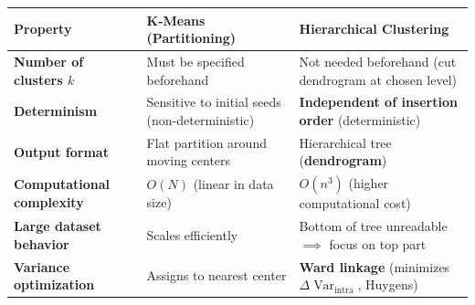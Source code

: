 \documentclass[10pt,a4paper]{article}
\begin{document}
\vspace{4pt}

\par\vspace{3pt}
\begin{center}
\small
\begin{tabular}{p{}p{}p{}}
\toprule
\rowcolor{lightbg}
\textbf{Property} & \textbf{K-Means (Partitioning)} & \textbf{Hierarchical Clustering} \\
\midrule
\textbf{Number of clusters $k$} & Must be specified beforehand & Not needed beforehand (cut dendrogram at chosen level) \\
\addlinespace[2pt]
\textbf{Determinism} & Sensitive to initial seeds (non-deterministic) & \textbf{Independent of insertion order} (deterministic) \\
\addlinespace[2pt]
\textbf{Output format} & Flat partition around moving centers & Hierarchical tree (\textbf{dendrogram}) \\
\addlinespace[2pt]
\textbf{Computational complexity} & \textbf{$O(N)$} (linear in data size) & \textbf{$O(n^3)$} (higher computational cost) \\
\addlinespace[2pt]
\textbf{Large dataset behavior} & Scales efficiently & Bottom of tree unreadable $\implies$ focus on top part \\
\addlinespace[2pt]
\textbf{Variance optimization} & Assigns to nearest center & \textbf{Ward linkage} (minimizes $\Delta\operatorname{Var}_{\text{intra}}$, Huygens) \\
\bottomrule
\end{tabular}
\end{center}
\end{document}

